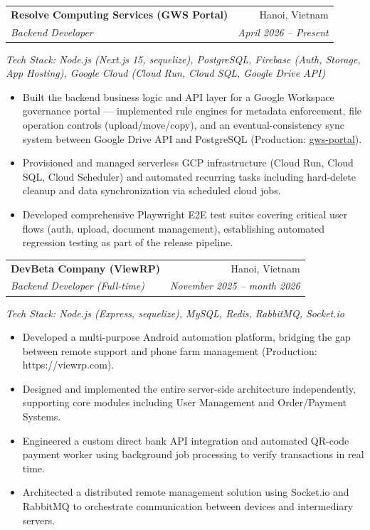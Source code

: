 \documentclass[letterpaper,11pt]{article}
\makeatletter
\newcommand{\resumeItem}[1]{
  \item\small{
    {#1 \vspace{-2pt}}
  }
}
\newcommand{\resumeSubheading}[4]{
  \vspace{-2pt}\item
    \begin{tabular*}{0.97\textwidth}[t]{l@{\extracolsep{\fill}}r}
      \textbf{#1} & #2 \\
      \textit{\small#3} & \textit{\small #4} \\
    \end{tabular*}\vspace{-7pt}
}
\newcommand{\resumeTechLine}[1]{
  \item[] \small{\textit{Tech Stack: #1}}\vspace{-6pt}
}
\newcommand{\resumeItemListStart}{\begin{itemize}}
\newcommand{\resumeItemListEnd}{\end{itemize}\vspace{-5pt}}
\makeatother
\begin{document}
    \resumeSubheading
      {Resolve Computing Services (GWS Portal)}{Hanoi, Vietnam}
      {Backend Developer}{April 2026 -- Present}
      \resumeTechLine{Node.js (Next.js 15, sequelize), PostgreSQL, Firebase (Auth, Storage, App Hosting), Google Cloud (Cloud Run, Cloud SQL, Google Drive API)}
      \resumeItemListStart
        \resumeItem{Built the backend business logic and API layer for a Google Workspace governance portal — implemented rule engines for metadata enforcement, file operation controls (upload/move/copy), and an eventual-consistency sync system between Google Drive API and PostgreSQL (Production: \href{https://gws-port-app-be--gws-portal-9ff49.us-central1.hosted.app/en}{gws-portal}).}
        \resumeItem{Provisioned and managed serverless GCP infrastructure (Cloud Run, Cloud SQL, Cloud Scheduler) and automated recurring tasks including hard-delete cleanup and data synchronization via scheduled cloud jobs.}
        \resumeItem{Developed comprehensive Playwright E2E test suites covering critical user flows (auth, upload, document management), establishing automated regression testing as part of the release pipeline.}
      \resumeItemListEnd

    \resumeSubheading
      {DevBeta Company (ViewRP)}{Hanoi, Vietnam}
      {Backend Developer (Full-time)}{November 2025 -- month 2026}
      \resumeTechLine{Node.js (Express, sequelize), MySQL, Redis, RabbitMQ, Socket.io}
      \resumeItemListStart
        \resumeItem{Developed a multi-purpose Android automation platform, bridging the gap between remote support and phone farm management (Production: https://viewrp.com).}
        \resumeItem{Designed and implemented the entire server-side architecture independently, supporting core modules including User Management and Order/Payment Systems.}
        \resumeItem{Engineered a custom direct bank API integration and automated QR-code payment worker using background job processing to verify transactions in real time.}
        \resumeItem{Architected a distributed remote management solution using Socket.io and RabbitMQ to orchestrate communication between devices and intermediary servers.}
      \resumeItemListEnd
\end{document}
